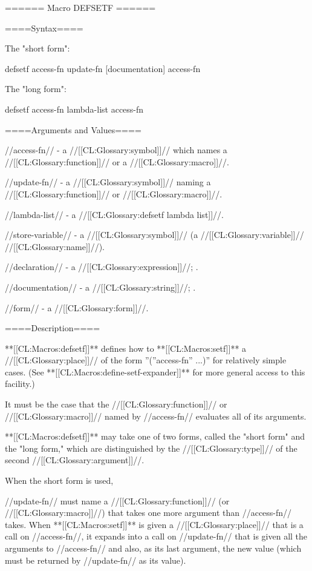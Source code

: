 ====== Macro DEFSETF ======

====Syntax====

The "short form":

\DefmacWithValuesNewline defsetf {access-fn update-fn [documentation]} {access-fn}

The "long form":

\DefmacWithValuesNewline defsetf {access-fn lambda-list  {\DeclsAndDoc} } {access-fn}

====Arguments and Values====

//access-fn// - a //[[CL:Glossary:symbol]]// which names a //[[CL:Glossary:function]]// or a //[[CL:Glossary:macro]]//.

//update-fn// - a //[[CL:Glossary:symbol]]// naming a //[[CL:Glossary:function]]// or //[[CL:Glossary:macro]]//.

//lambda-list// - a //[[CL:Glossary:defsetf lambda list]]//.

//store-variable// - a //[[CL:Glossary:symbol]]// (a //[[CL:Glossary:variable]]// //[[CL:Glossary:name]]//).

//declaration// - a  //[[CL:Glossary:expression]]//; \noeval.

//documentation// - a //[[CL:Glossary:string]]//; \noeval.

//form// - a //[[CL:Glossary:form]]//.

====Description====

**[[CL:Macros:defsetf]]** defines how to **[[CL:Macros:setf]]** a //[[CL:Glossary:place]]// of the form ''(''access-fn'' ...)'' for relatively simple cases. (See **[[CL:Macros:define-setf-expander]]** for more general access to this facility.)

It must be the case that the //[[CL:Glossary:function]]// or //[[CL:Glossary:macro]]// named by //access-fn// evaluates all of its arguments.

**[[CL:Macros:defsetf]]** may take one of two forms, called the "short form" and the "long form," which are distinguished by the //[[CL:Glossary:type]]// of the second //[[CL:Glossary:argument]]//.

When the short form is used,

//update-fn// must name a //[[CL:Glossary:function]]// (or //[[CL:Glossary:macro]]//) that takes one more argument than //access-fn// takes. When **[[CL:Macros:setf]]** is given a //[[CL:Glossary:place]]// that is a call on //access-fn//, it expands into a call on //update-fn// that is given all the arguments to //access-fn// and also, as its last argument, the new value (which must be returned by //update-fn// as its value).

